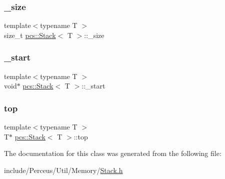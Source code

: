 \mbox{\label{classpcs_1_1Stack_a064acf31b252beb9c49983c31b5fc668}} 
\subsubsection{\texorpdfstring{\+\_\+size}{\_size}}
{\footnotesize\ttfamily template$<$typename T $>$ \\
size\+\_\+t \hyperlink{classpcs_1_1Stack}{pcs\+::\+Stack}$<$ T $>$\+::\+\_\+size\hspace{0.3cm}{\ttfamily [private]}}

\mbox{\label{classpcs_1_1Stack_af6cd160aa4460d364627b09467c19b0b}} 
\subsubsection{\texorpdfstring{\+\_\+start}{\_start}}
{\footnotesize\ttfamily template$<$typename T $>$ \\
void$\ast$ \hyperlink{classpcs_1_1Stack}{pcs\+::\+Stack}$<$ T $>$\+::\+\_\+start\hspace{0.3cm}{\ttfamily [private]}}

\mbox{\label{classpcs_1_1Stack_a8aa862072c58e84468001f177edb80cb}} 
\subsubsection{\texorpdfstring{top}{top}}
{\footnotesize\ttfamily template$<$typename T $>$ \\
T$\ast$ \hyperlink{classpcs_1_1Stack}{pcs\+::\+Stack}$<$ T $>$\+::top\hspace{0.3cm}{\ttfamily [private]}}



The documentation for this class was generated from the following file\+:\begin{DoxyCompactItemize}
\item 
include/\+Perceus/\+Util/\+Memory/\hyperlink{Stack_8h}{Stack.\+h}\end{DoxyCompactItemize}
